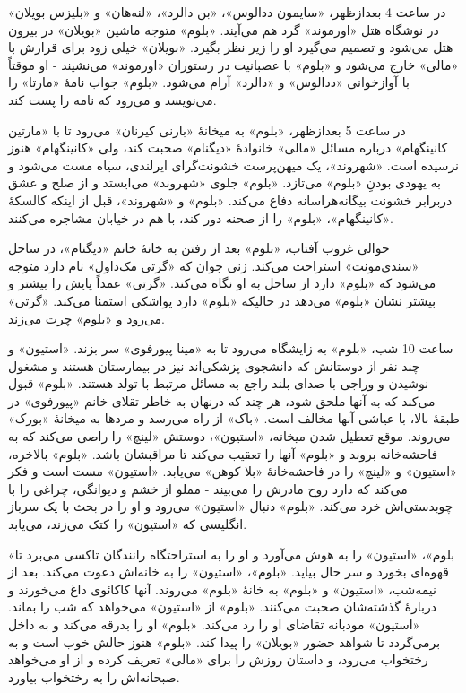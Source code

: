 \documentclass[12pt]{book}
\newcommand{\noun}[1]{«{#1}»}
\begin{document}
    در ساعت 4 بعدازظهر، \noun{سایمون ددالوس}، \noun{بن دالرد}، \noun{لنه‌هان} و \noun{بلیزس بویلان} در نوشگاه هتل \noun{اورموند} گرد هم می‌آیند. \noun{بلوم} متوجه ماشین \noun{بویلان} در بیرون هتل می‌شود و تصمیم می‌گیرد او را زیر نظر بگیرد. \noun{بویلان} خیلی زود برای قرارش با \noun{مالی} خارج می‌شود و \noun{بلوم} با عصبانیت در رستوران \noun{اورموند} می‌نشیند - او موقتاً با آوازخوانی \noun{ددالوس} و \noun{دالرد} آرام می‌شود. \noun{بلوم} جواب نامۀ \noun{مارتا} را می‌نویسد و می‌رود که نامه را پست کند.

    در ساعت 5 بعدازظهر، \noun{بلوم} به میخانۀ \noun{بارنی کیرنان} می‌رود تا با \noun{مارتین کانینگهام} درباره مسائل \noun{مالی} خانوادۀ \noun{دیگنام} صحبت کند، ولی \noun{کانینگهام} هنوز نرسیده است. \noun{شهروند}، یک میهن‌پرست خشونت‌گرای ایرلندی، سیاه مست می‌شود و به یهودی بودنِ \noun{بلوم} می‌تازد. \noun{بلوم} جلوی \noun{شهروند} می‌ایستد و از صلح و عشق دربرابر خشونت بیگانه‌هراسانه دفاع می‌کند. \noun{بلوم} و \noun{شهروند}، قبل از اینکه کالسکۀ \noun{کانینگهام}، \noun{بلوم} را از صحنه دور کند، با هم در خیابان مشاجره می‌کنند.

    حوالی غروب آفتاب، \noun{بلوم} بعد از رفتن به خانۀ خانم \noun{دیگنام}، در ساحل \noun{سندی‌مونت} استراحت می‌کند. زنی جوان که \noun{گرتی مک‌داول} نام دارد متوجه می‌شود که \noun{بلوم} دارد از ساحل به او نگاه می‌کند. \noun{گرتی} عمداً پایش را بیشتر و بیشتر نشان \noun{بلوم} می‌دهد در حالیکه \noun{بلوم} دارد یواشکی استمنا می‌کند. \noun{گرتی} می‌رود و \noun{بلوم} چرت می‌زند.

    ساعت 10 شب، \noun{بلوم} به زایشگاه می‌رود تا به \noun{مینا پیورفوی} سر بزند. \noun{استیون} و چند نفر از دوستانش که دانشجوی پزشکی‌اند نیز در بیمارستان هستند و مشغول نوشیدن و وراجی با صدای بلند راجع به مسائل مرتبط با تولد هستند. \noun{بلوم} قبول می‌کند که به آنها ملحق شود، هر چند که درنهان به خاطر تقلای خانم \noun{پیورفوی} در طبقۀ بالا، با عیاشی آنها مخالف است. \noun{باک} از راه می‌رسد و مردها به میخانۀ \noun{بورک} می‌روند. موقع تعطیل شدن میخانه، \noun{استیون}، دوستش \noun{لینچ} را راضی می‌کند که به فاحشه‌خانه بروند و \noun{بلوم} آنها را تعقیب می‌کند تا مراقبشان باشد.
    \noun{بلوم} بالاخره، \noun{استیون} و \noun{لینچ} را در فاحشه‌خانۀ \noun{بلا کوهن} می‌یابد. \noun{استیون} مست است و فکر می‌کند که دارد روح مادرش را می‌بیند - مملو از خشم و دیوانگی، چراغی را با چوبدستی‌اش خرد می‌کند. \noun{بلوم} دنبال \noun{استیون} می‌رود و او را در بحث با یک سرباز انگلیسی که \noun{استیون} را کتک می‌زند، می‌یابد.

    \noun{بلوم}، \noun{استیون} را به هوش می‌آورد و او را به استراحتگاه رانندگان تاکسی می‌برد تا قهوه‌ای بخورد و سر حال بیاید. \noun{بلوم}، \noun{استیون} را به خانه‌اش دعوت می‌کند.
    بعد از نیمه‌شب، \noun{استیون} و \noun{بلوم} به خانۀ \noun{بلوم} می‌روند. آنها کاکائوی داغ می‌خورند و دربارۀ گذشته‌شان صحبت می‌کنند. \noun{بلوم} از \noun{استیون} می‌خواهد که شب را بماند. \noun{استیون} مودبانه تقاضای او را رد می‌کند. \noun{بلوم} او را بدرقه می‌کند و به داخل برمی‌گردد تا شواهد حضور \noun{بویلان} را پیدا کند. \noun{بلوم} هنوز حالش خوب است و به رختخواب می‌رود، و داستان روزش را برای \noun{مالی} تعریف کرده و از او می‌خواهد صبحانه‌اش را به رختخواب بیاورد.
\end{document}
